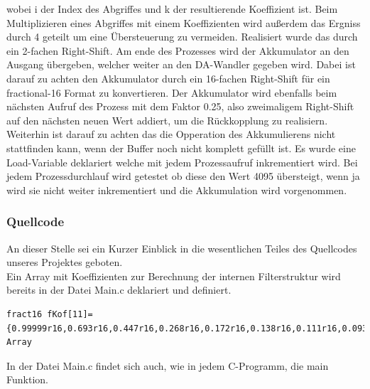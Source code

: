 \documentclass[a4paper,12pt,fontsize=12,DIV=12]{scrartcl}
\begin{document}
wobei i der Index des Abgriffes und k der resultierende Koeffizient ist.
Beim Multiplizieren eines Abgriffes mit einem Koeffizienten wird außerdem das Ergniss durch 4 geteilt um eine Übersteuerung zu vermeiden. Realisiert wurde das durch ein 2-fachen Right-Shift.
Am ende des Prozesses wird der Akkumulator an den Ausgang übergeben, welcher weiter an den DA-Wandler gegeben wird. Dabei ist darauf zu achten den Akkumulator durch ein 16-fachen Right-Shift für ein fractional-16 Format zu konvertieren.
Der Akkumulator wird ebenfalls beim nächsten Aufruf des Prozess mit dem Faktor 0.25, also zweimaligem Right-Shift auf den nächsten neuen Wert addiert, um die Rückkopplung zu realisiern.
Weiterhin ist darauf zu achten das die Opperation des Akkumulierens nicht stattfinden kann, wenn der Buffer noch nicht komplett gefüllt ist. Es wurde eine Load-Variable deklariert welche mit jedem Prozessaufruf inkrementiert wird. Bei jedem Prozessdurchlauf wird getestet ob diese den Wert 4095 übersteigt, wenn ja wird sie nicht weiter inkrementiert und die Akkumulation wird vorgenommen.

\subsubsection{Quellcode}
An dieser Stelle sei ein Kurzer Einblick in die wesentlichen Teiles des Quellcodes unseres Projektes geboten.
 \\
\newline
Ein Array mit Koeffizienten zur Berechnung der internen Filterstruktur wird bereits in der Datei Main.c deklariert und definiert.
\newline%

\begin{lstlisting}[title=Koeffizientenarray Dekleration \& Definition in Main.c]
fract16 fKof[11]={0.99999r16,0.693r16,0.447r16,0.268r16,0.172r16,0.138r16,0.111r16,0.093r16,0.077r16,0.066r16,0.053r16};//Koeffizienten Array 
\end{lstlisting}

\newpage
In der Datei Main.c findet sich auch, wie in jedem C-Programm, die main Funktion.
\end{document}
